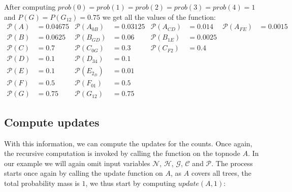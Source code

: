 \documentclass{article}
\newcommand{\G}{\mathcal{G}}
\newcommand{\Hg}{\mathcal{H}}
\newcommand{\N}{\mathcal{N}}
\newcommand{\C}{\mathcal{C}}
\newcommand{\Pp}{\mathcal{P}}
\begin{document}
\noindent After computing $prob(0)=prob(1) = prob(2) = prob(3) = prob(4) = 1$ and $P(G) = P(G_{12}) = 0.75$ we get all the values of the function:
\begin{align*}
\Pp(A) &= 0.04675 & 	\Pp(A_{0B}) &= 0.03125 &	\Pp(A_{CD}) &= 0.014 &	 \Pp(A_{FE}) &= 0.0015 \\
\Pp(B) &= 0.0625 & 	\Pp(B_{GD}) &=0.06 &	 	\Pp(B_{1E}) &= 0.0025\\
\Pp(C) &= 0.7 & 		\Pp(C_{0G}) &= 0.3 & 		\Pp(C_{F2}) &= 0.4\\
\Pp(D) &= 0.1 & 		\Pp(D_{34}) &= 0.1 \\
\Pp(E) &= 0.1 & 		\Pp(E_{2_D})&= 0.01 \\
\Pp(F) &=  0.5 & 		\Pp(F_{01}) &= 0.5 \\
\Pp(G) &= 0.75 & 		\Pp(G_{12}) &= 0.75
\end{align*}

\subsection{Compute updates}

With this information, we can compute the updates for the counts. Once again, the recursive computation is invoked by calling the function on the topnode $A$. In our example we will again omit input variables $\N$, $\Hg$, $\G$, $\C$ and $\Pp$. The process starts once again by calling the update function on $A$, as $A$ covers all trees, the total probability mass is $1$, we thus start by computing $update(A,1)$:
\end{document}
